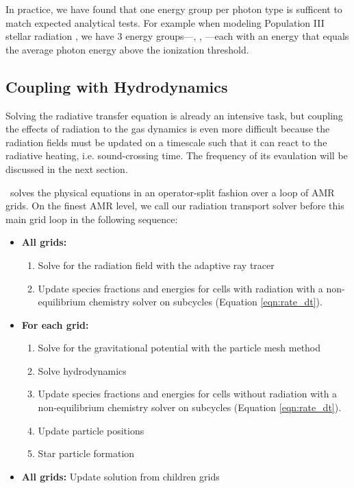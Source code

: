 \documentclass[12pt,preprint]{aastex}
\begin{document}
In practice, we have found that one energy group per photon type is
sufficent to match expected analytical tests.  For example when
modeling Population III stellar radiation \citep[e.g.][for hydrogen
  ionizing radiation only]{Abel07, Wise08b}, we have 3 energy
groups---, , ---each with an energy
that equals the average photon energy above the ionization threshold.

\subsection{Coupling with Hydrodynamics}
\label{sec:coupling}

Solving the radiative transfer equation is already an intensive task,
but coupling the effects of radiation to the gas dynamics is even more
difficult because the radiation fields must be updated on a timescale
such that it can react to the radiative heating, i.e. sound-crossing
time.  The frequency of its evaulation will be discussed in the next
section.

\enzo~solves the physical equations in an operator-split fashion over
a loop of AMR grids.  On the finest AMR level, we call our radiation
transport solver before this main grid loop in the following sequence:
\begin{itemize}
\item \textbf{All grids:}
  \begin{enumerate}
  \item Solve for the radiation field with the adaptive ray tracer
  \item Update species fractions and energies for cells with radiation
    with a non-equilibrium chemistry solver on subcycles (Equation
    \ref{eqn:rate_dt}).
  \end{enumerate}
\item \textbf{For each grid:}
  \begin{enumerate}
  \item Solve for the gravitational potential with the particle mesh
    method
  \item Solve hydrodynamics
  \item Update species fractions and energies for cells without
    radiation with a non-equilibrium chemistry solver on subcycles
    (Equation \ref{eqn:rate_dt}).
  \item Update particle positions
  \item Star particle formation
  \end{enumerate}
\item \textbf{All grids:} Update solution from children grids
\end{itemize}
%
\end{document}
